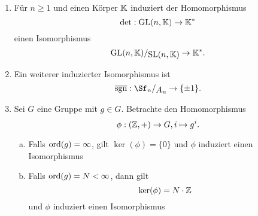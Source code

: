 \begin{beispiele}
\begin{enumerate}
\item Für $n \geq 1$ und einen Körper $\mathbb{K}$ induziert der Homomorphismus
\begin{equation}
\det: \text{GL}(n,\mathbb{K}) \to \mathbb{K}^\ast
\end{equation}
einen Isomorphismus
\begin{equation}
\quotient{\text{GL}(n,\K)}{\text{SL}(n, \K)} \to \K^\ast.
\end{equation}
\item Ein weiterer induzierter Isomorphismus ist
\begin{equation}
\overline{\sgn}: \quotient{\Sf_n}{A_n} \to \{\pm 1\}.
\end{equation}
\item Sei $G$ eine Gruppe mit $g \in G$. Betrachte den Homomorphismus
\begin{equation}
\phi: (\mathbb{Z}, +) \to G, i \mapsto g^i.
\end{equation}
\begin{enumerate}[(a)]
\item Falls $\operatorname{\text{ord}} (g) = \infty$, gilt $\ker (\phi) = \{0\}$ und $\phi$ induziert einen Isomorphismus
\begin{center}
\end{center}
\item Falls $\operatorname{\text{ord}} (g) =N < \infty$, dann gilt
\begin{equation}
\ker (\phi) = N \cdot \mathbb{Z}
\end{equation}
und $\phi$ induziert einen Isomorphismus
\begin{center}
\end{center}
\end{enumerate}
\end{enumerate}
\end{beispiele}
